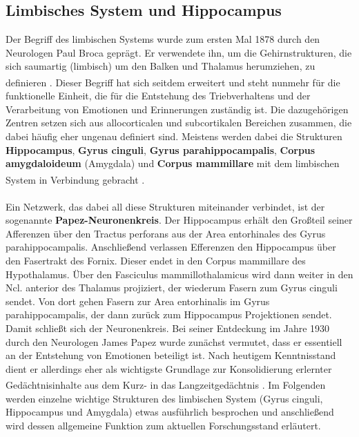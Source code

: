 \documentclass[12pt,a4paper,pdftex]{article}
\begin{document}
\subsection{Limbisches System und Hippocampus} \label{subsec:limisches_system} 
Der Begriff des limbischen Systems wurde zum ersten Mal 1878 durch den Neurologen Paul Broca geprägt. Er verwendete ihn, um die Gehirnstrukturen, die sich saumartig (limbisch) um den Balken und Thalamus herumziehen, zu definieren \textsuperscript{\cite[18]{neurowissenschaften_baer}}. Dieser Begriff hat sich seitdem erweitert und steht nunmehr für die funktionelle Einheit, die für die Entstehung des Triebverhaltens und der Verarbeitung von Emotionen und Erinnerungen zuständig ist. Die dazugehörigen Zentren setzen sich aus allocorticalen und subcortikalen Bereichen zusammen, die dabei häufig eher ungenau definiert sind. Meistens werden dabei die Strukturen \textbf{Hippocampus}, \textbf{Gyrus cinguli}, \textbf{Gyrus parahippocampalis}, \textbf{Corpus amygdaloideum} (Amygdala) und \textbf{Corpus mammillare}   mit dem limbischen System in Verbindung gebracht \textsuperscript{\cite[9]{trepel2011neuroanatomie}}.\\ 
\\ \noindent Ein Netzwerk, das dabei all diese Strukturen miteinander verbindet, ist der sogenannte \textbf{Papez-Neuronenkreis}. Der Hippocampus erhält den Großteil seiner Afferenzen über den Tractus perforans aus der Area entorhinales des Gyrus parahippocampalis. Anschließend verlassen Efferenzen den Hippocampus über den Fasertrakt des Fornix. Dieser endet in den Corpus mammillare des Hypothalamus. Über den Fasciculus mammillothalamicus wird dann weiter in den Ncl. anterior des Thalamus projiziert, der wiederum Fasern zum Gyrus cinguli sendet. Von dort gehen Fasern zur Area entorhinalis im Gyrus parahippocampalis, der dann zurück zum Hippocampus Projektionen sendet. Damit schließt sich der Neuronenkreis. Bei seiner Entdeckung im Jahre 1930 durch den Neurologen James Papez wurde zunächst vermutet, dass er essentiell an der Entstehung von Emotionen beteiligt ist. Nach heutigem Kenntnisstand dient er allerdings eher als wichtigste Grundlage zur Konsolidierung erlernter Gedächtnisinhalte aus dem Kurz- in das Langzeitgedächtnis \textsuperscript{\cite[9]{trepel2011neuroanatomie}}. Im Folgenden werden einzelne wichtige Strukturen des limbischen System (Gyrus cinguli, Hippocampus und Amygdala) etwas ausführlich besprochen und anschließend wird dessen allgemeine Funktion zum aktuellen Forschungsstand erläutert.
\end{document}
